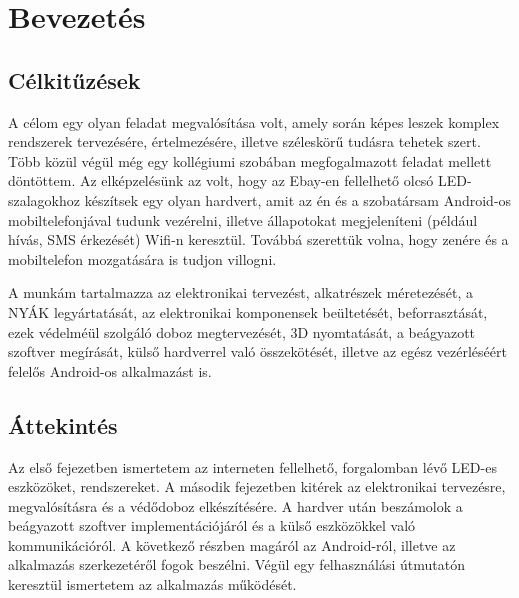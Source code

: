 \documentclass[../main.tex]{subfiles}
\begin{document}
\section{Bevezetés}
    \subsection{Célkitűzések}
        A célom egy olyan feladat megvalósítása volt, amely során képes leszek komplex rendszerek tervezésére, értelmezésére, illetve széleskörű tudásra tehetek szert. Több közül végül még egy kollégiumi szobában megfogalmazott feladat mellett döntöttem. 
        Az elképzelésünk az volt, hogy az Ebay-en fellelhető olcsó LED-szalagokhoz készítsek egy olyan hardvert, amit az én és a szobatársam Android-os mobiltelefonjával tudunk vezérelni, illetve állapotokat megjeleníteni (például hívás, SMS érkezését) Wifi-n keresztül. Továbbá szerettük volna, hogy zenére és a mobiltelefon mozgatására is tudjon villogni. 
        
        A munkám tartalmazza az elektronikai tervezést, alkatrészek méretezését, a NYÁK legyártatását, az elektronikai komponensek beültetését, beforrasztását, ezek védelméül szolgáló doboz megtervezését, 3D nyomtatását, a beágyazott szoftver megírását, külső hardverrel való összekötését, illetve az egész vezérléséért felelős Android-os alkalmazást is. 
    \subsection{Áttekintés}
        Az első fejezetben ismertetem az interneten fellelhető, forgalomban lévő LED-es eszközöket, rendszereket.
        A második fejezetben kitérek az elektronikai tervezésre, megvalósításra és a védődoboz elkészítésére.
        A hardver után beszámolok a beágyazott szoftver implementációjáról és a külső eszközökkel való kommunikációról.
        A következő részben magáról az Android-ról, illetve az alkalmazás szerkezetéről fogok beszélni. Végül egy felhasználási útmutatón keresztül ismertetem az alkalmazás működését.
\end{document}
